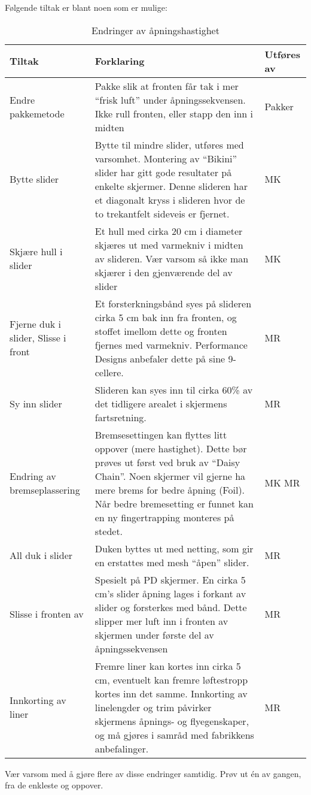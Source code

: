 Følgende tiltak er blant noen som er mulige:
\begin{table}
	\caption{Endringer av åpningshastighet}
	\begin{tabular}{ | p{2cm} | p{7cm} | p{1cm} | }
		\hline
		Tiltak & Forklaring & Utføres av \\
		\hline
		Endre pakkemetode &
		Pakke slik at fronten får tak i mer ``frisk luft'' under åpningssekvensen.
		Ikke rull fronten, eller stapp den inn i midten &
		Pakker \\
		\hline
		Bytte slider &
		Bytte til mindre slider, utføres med varsomhet.
		Montering av ``Bikini'' slider har gitt gode resultater på enkelte skjermer. Denne slideren har et diagonalt kryss i slideren hvor de to trekantfelt sideveis er fjernet. &
		MK \\
		\hline
		Skjære hull i slider &
		Et hull med cirka 20 cm i diameter skjæres ut med varmekniv i midten av slideren.
		Vær varsom så ikke man skjærer i den gjenværende del av slider &
		MK \\
		\hline
		Fjerne duk i slider,
		Slisse i front &
		Et forsterkningsbånd syes på slideren cirka 5 cm bak inn fra fronten, og stoffet imellom dette og fronten fjernes med varmekniv.
		Performance Designs anbefaler dette på sine 9-cellere. &
		MR \\
		\hline
		Sy inn slider &
		Slideren kan syes inn til cirka 60\% av det tidligere arealet i skjermens fartsretning. &
		MR \\
		\hline
		Endring av bremseplassering &
		Bremsesettingen kan flyttes litt oppover (mere hastighet). Dette bør prøves ut først ved bruk av ``Daisy Chain''.
		Noen skjermer vil gjerne ha mere brems for bedre åpning (Foil).
		Når bedre bremesetting er funnet kan en ny fingertrapping monteres på stedet. &
		MK
		MR \\
		\hline
		All duk i slider &
		Duken byttes ut med netting, som gir en erstattes med mesh ``åpen'' slider. &
		MR \\
		\hline
		Slisse i fronten av &
		Spesielt på PD skjermer. En cirka 5 cm’s slider åpning lages i forkant av slider og forsterkes med bånd. Dette slipper mer luft inn i fronten av skjermen under første del av åpningssekvensen &
		MR \\
		\hline
		Innkorting av liner &
		Fremre liner kan kortes inn cirka 5 cm, eventuelt kan fremre løftestropp kortes inn det samme.
		Innkorting av linelengder og trim påvirker skjermens åpnings- og flyegenskaper, og må gjøres i samråd med fabrikkens anbefalinger. &
		MR \\
		\hline		
	\end{tabular}
\end{table}

Vær varsom med å gjøre flere av disse endringer samtidig. Prøv ut én av gangen, fra de enkleste og oppover.
